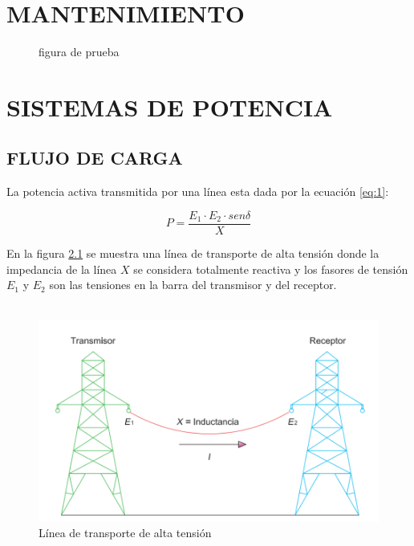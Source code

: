 \documentclass[a5paper]{book}%
\begin{document}
\chapter{MANTENIMIENTO}


\begin{figure}[H]
  \centering
  \caption{figura de prueba}
  \label{fig:prueba}
\end{figure}

\chapter{SISTEMAS DE  POTENCIA}

\section{FLUJO DE CARGA}
La potencia activa transmitida por una línea esta dada por la ecuación \ref{eq:1}:

\begin{equation}
  \label{eq:1}
  P=\dfrac{E_{1} \cdot E_{2} \cdot sen\delta } {X}
\end{equation}

En la figura \ref{fig:lineaat} se muestra una línea de transporte de alta tensión donde la impedancia de la línea \textit{$X$} se considera totalmente reactiva y los fasores de tensión  \textbf{$E_{1}$ }y \textbf{$E_{2}$} son las tensiones en la barra del transmisor y del receptor.\\\\

\begin{figure}[H]
  \centering
  
  \caption{Línea de transporte de alta tensión}
  \label{fig:lineaat}
  \includegraphics[width=\linewidth]{linea_transporte_AT}
\end{figure}
\end{document}
